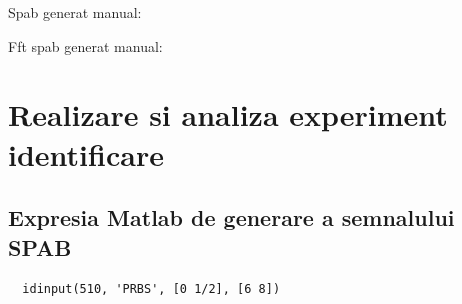 \documentclass[12pt,english]{article}
\begin{document}
Spab generat manual:
\begin{center}
\end{center}
Fft spab generat manual:
\begin{center}
\end{center}

\section {Realizare si analiza experiment identificare }
\subsection {Expresia Matlab de generare a semnalului SPAB }
\begin{lstlisting}
  idinput(510, 'PRBS', [0 1/2], [6 8])
\end{lstlisting}
\end{document}
